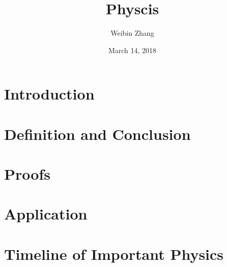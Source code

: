 \documentclass[12pt]{report}
\title{Physcis}
\author{Weibin Zhang}
\date{March 14, 2018}
\begin{document}
\maketitle

\tableofcontents






\part{Introduction}

    


\part{Definition and Conclusion}






\part{Proofs}








\part{Application}


\part{Timeline of Important Physics}

\end{document}
